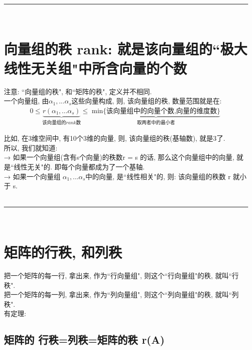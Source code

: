 \documentclass[UTF8]{ctexart}
\begin{document}
~\\
\hrule
~\\

\section{向量组的秩 rank: 就是该向量组的``极大线性无关组"中所含向量的个数}

注意: ``向量组的秩", 和``矩阵的秩", 定义并不相同. \\

一个向量组, 由$\alpha _1,...\alpha _s$这些向量构成, 则, 该向量组的秩, 数量范围就是在: 
\begin{align*}
0\leq \underset{\text{该向量组的}rank\text{数}}{\underbrace{r\left( \alpha _1,...\alpha _s \right) }}\leq \underset{\text{取两者中的最小者}}{\underbrace{\min\text{\{该向量组中的向量个数,向量的维度数\}}}}
\end{align*}

比如, 在3维空间中, 有10个3维的向量, 则, 该向量组的秩(基轴数), 就是3了.\\

所以, 我们就知道: \\
→ 如果一个向量组(含有s个向量)的秩数r = s 的话, 那么这个向量组中的向量, 就是``线性无关"的. 即每个向量都成为了一个基轴.\\
→ 如果一个向量组 $\alpha _1,...\alpha _s$中的向量, 是``线性相关"的, 则: 该向量组的秩数 r 就小于 s. \\

~\\
\hrule
~\\

\section{矩阵的行秩, 和列秩}

把一个矩阵的每一行, 拿出来, 作为``行向量组", 则这个``行向量组"的秩, 就叫``行秩". \\
把一个矩阵的每一列, 拿出来, 作为``列向量组", 则这个``列向量组"的秩, 就叫``列秩". \\

有定理: 

\subsection{矩阵的 行秩=列秩=矩阵的秩 r(A)}











\end{document}
